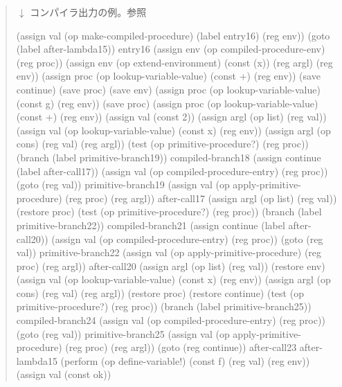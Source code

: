 \begin{quote}
 \( \downarrow \) コンパイラ出力の例。参照

\begin{smallscheme}
(assign val 
        (op make-compiled-procedure) 
        (label entry16) 
        (reg env))
  (goto (label after-lambda15))
entry16
  (assign env (op compiled-procedure-env) (reg proc))
  (assign env
          (op extend-environment) 
          (const (x)) 
          (reg argl) 
          (reg env))
  (assign proc 
          (op lookup-variable-value) 
          (const +) 
          (reg env))
  (save continue)
  (save proc)
  (save env)
  (assign proc 
          (op lookup-variable-value) 
          (const g) 
          (reg env))
  (save proc)
  (assign proc 
          (op lookup-variable-value) 
          (const +) 
          (reg env))
  (assign val (const 2))
  (assign argl (op list) (reg val))
  (assign val 
          (op lookup-variable-value) 
          (const x) 
          (reg env))
  (assign argl (op cons) (reg val) (reg argl))
  (test (op primitive-procedure?) (reg proc))
  (branch (label primitive-branch19))
compiled-branch18
  (assign continue (label after-call17))
  (assign val (op compiled-procedure-entry) (reg proc))
  (goto (reg val))
primitive-branch19
  (assign val 
          (op apply-primitive-procedure) 
          (reg proc) 
          (reg argl))
after-call17
  (assign argl (op list) (reg val))
  (restore proc)
  (test (op primitive-procedure?) (reg proc))
  (branch (label primitive-branch22))
compiled-branch21
  (assign continue (label after-call20))
  (assign val (op compiled-procedure-entry) (reg proc))
  (goto (reg val))
primitive-branch22
  (assign val 
          (op apply-primitive-procedure) 
          (reg proc) 
          (reg argl))
after-call20
  (assign argl (op list) (reg val))
  (restore env)
  (assign val 
          (op lookup-variable-value) 
          (const x) 
          (reg env))
  (assign argl (op cons) (reg val) (reg argl))
  (restore proc)
  (restore continue)
  (test (op primitive-procedure?) (reg proc))
  (branch (label primitive-branch25))
compiled-branch24
  (assign val 
          (op compiled-procedure-entry) 
          (reg proc))
  (goto (reg val))
primitive-branch25
  (assign val 
          (op apply-primitive-procedure) 
          (reg proc) 
          (reg argl))
  (goto (reg continue))
after-call23
after-lambda15
  (perform (op define-variable!) 
           (const f) 
           (reg val) 
           (reg env))
  (assign val (const ok))
\end{smallscheme}

\end{quote}

